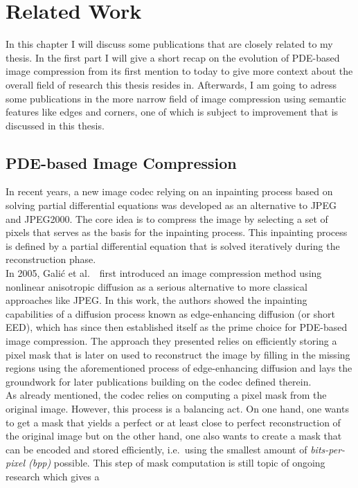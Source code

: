 \chapter{Related Work}\label{ch:RelatedWork}
In this chapter I will discuss some publications that are closely related to my thesis. 
In the first part I will give a short recap on the evolution of PDE-based image compression from
its first mention to today to give more context about the overall field of research this thesis 
resides in.
Afterwards, I am going to adress some publications in the more narrow field of image compression
using semantic features like edges and corners, one of which is subject to improvement that is 
discussed in this thesis.
\section{PDE-based Image Compression}
In recent years, a new image codec relying on an inpainting process based on solving partial
differential equations was developed as an alternative to JPEG and JPEG2000. 
The core idea is to compress the image by selecting a set of pixels that serves as the basis for the 
inpainting process. 
This inpainting process is defined by a partial differential equation that is solved iteratively during 
the reconstruction phase.\\
In 2005, Galić et al.~\cite{galic05}\ first introduced an image compression method using nonlinear
anisotropic diffusion as a serious alternative to more classical approaches like JPEG.\@
In this work, the authors showed the inpainting capabilities of a diffusion process known as edge-enhancing
diffusion (or short EED), which has since then established itself as the prime choice for PDE-based image
compression. The approach they presented relies on efficiently storing a pixel mask that is later
on used to reconstruct the image by filling in the missing regions using the aforementioned process
of edge-enhancing diffusion and lays the groundwork for later publications building on the codec
defined therein. \\
As already mentioned, the codec relies on computing a pixel mask from the original image. However,
this process is a balancing act. On one hand, one wants to get a mask that yields a perfect
or at least close to perfect reconstruction of the original image but on the other hand, one 
also wants to create a mask that
can be encoded and stored efficiently, i.e.\ using the smallest amount of \textit{bits-per-pixel
(bpp)} possible. This step of mask computation is still topic of ongoing research which gives a
